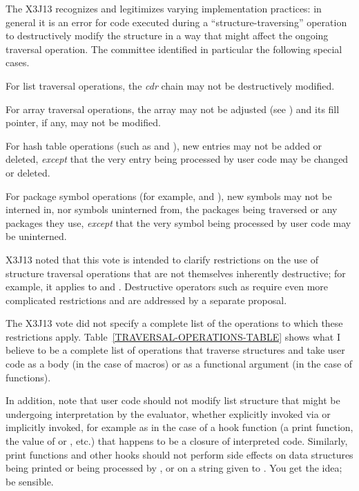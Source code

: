 The X3J13 recognizes and legitimizes varying implementation practices:
in general it is an error for code executed during a ``structure-traversing''
operation to destructively modify the structure in a way that might
affect the ongoing traversal operation.  The committee identified in particular
the following special cases.

For list traversal operations, the \emph{cdr} chain
may not be destructively modified.

For array traversal operations, the array may not be adjusted
(see ) and its fill pointer, if any, may not be modified.

For hash table operations (such as 
and ), new entries may not be added or deleted,
\emph{except} that the very entry being processed by user code
may be changed or deleted.

For package symbol operations (for example, 
and ), new symbols may not be interned in,
nor symbols uninterned from, the packages being traversed or
any packages they use, \emph{except} that the very symbol
being processed by user code may be uninterned.

X3J13 noted that this vote is intended to clarify restrictions
on the use of structure traversal operations that are not themselves
inherently destructive; for example, it applies to  and .
Destructive operators such as  require even more complicated
restrictions and are addressed by a separate proposal.

The X3J13 vote did not specify a complete list of the operations to which these
restrictions apply.  Table~\ref{TRAVERSAL-OPERATIONS-TABLE}
shows what I believe to be a complete list of operations
that traverse structures and take user code as a body (in the case of
macros) or as a functional argument (in the case of functions).

In addition, note that user code should not modify list
structure that might be undergoing interpretation by the evaluator,
whether explicitly invoked via  or implicitly invoked,
for example as in the case of a hook function (a 
print function, the value of  or , etc.)
that happens to be a closure of interpreted code.  Similarly, 
print functions and other hooks should not perform side effects
on data structures being printed or being processed by , or on a
string given to .  You get the idea;
be sensible.

